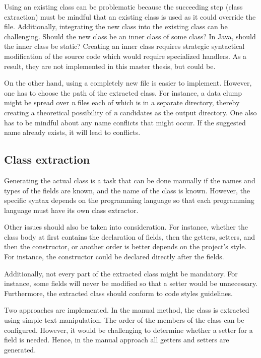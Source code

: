 Using an existing class can be problematic because the succeeding step (class extraction) must be mindful that an existing class is used as it could override the file. Additionally, integrating the new class into the existing class can be challenging. Should the new class be an inner class of some class? In Java, should the inner class be static?  Creating an inner class requires strategic syntactical modification of the source code which would require specialized handlers. As a result, they are not implemented in this master thesis, but could be. 

On the other hand, using a completely new file is easier to implement. However, one has to choose the path of the extracted class. For instance, a data clump might be spread over \textit{n} files each of which is in a separate directory, thereby creating a theoretical possibility of \textit{n} candidates as the output directory. 
One also has to be mindful about any name conflicts that might occur. If the suggested name already exists, it will lead to conflicts.


\subsection{Class extraction}

Generating the actual class is a task that can be done manually if the names and types of the fields are known, and the name of the class is known. However, the specific syntax depends on the programming language so that each programming language must have its own class extractor.

Other issues should also be taken into consideration. For instance, whether the class body at first contains the declaration of fields, then the getters, setters, and then the constructor, or another order is better depends on the project's style. For instance, the constructor could be declared directly after the fields.

Additionally, not every part of the extracted class might be mandatory. For instance, some fields will never be modified so that a setter would be unnecessary. Furthermore, the extracted class should conform to code styles guidelines. 

Two approaches are implemented. In the manual method, the class is extracted using simple text manipulation. The order of the members of the class can be configured.  However, it would be challenging to determine whether a setter for a field is needed. Hence, in the manual approach all getters and setters are generated.

